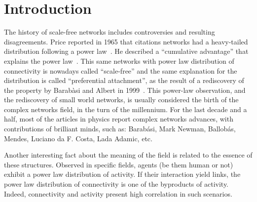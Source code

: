\documentclass[a4paper, 11pt]{article} %
\begin{document}
\section{Introduction}\label{sec:intro}
The history of scale-free networks includes controversies and resulting disagreements. Price reported in 1965 that citations networks had a heavy-tailed distribution following a power law~\cite{price1}. He described a ``cumulative advantage'' that explains the power law~\cite{price2}. This same networks with power law distribution of connectivity is nowadays called ``scale-free'' and the same explanation for the distribution is called ``preferential attachment'', as the result of a rediscovery of the property by Barab\`asi and Albert in 1999~\cite{barabasi1}. This power-law observation, and the rediscovery of small world networks, is usually considered the birth of the complex networks field, in the turn of the millennium. For the last decade and a half, most of the articles in physics report complex networks advances, with contributions of brilliant minds, such as: Barab\'asi, Mark Newman, Ballob\'as, Mendes, Luciano da F. Costa, Lada Adamic, etc.

Another interesting fact about the meaning of the field is related to the essence of these structures. Observed in specific fields, agents (be them human or not) exhibit a power law distribution of activity. If their interaction yield links, the power law distribution of connectivity is one of the byproducts of activity. Indeed, connectivity and activity present high correlation in such scenarios.
\end{document}
